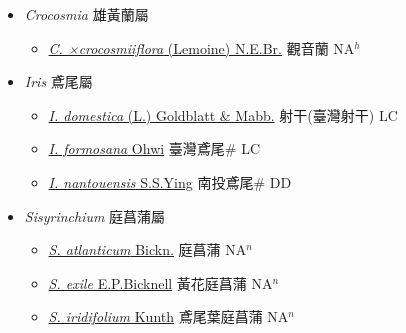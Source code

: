 
  \begin{itemize}
 \item[] \textit{Crocosmia} 雄黃蘭屬
                    
  \begin{itemize}
        \item[] \href{http://www.theplantlist.org/tpl1.1/search?q=Crocosmia+×crocosmiiflora}{\textit{C. ×crocosmiiflora} (Lemoine) N.E.Br.}   觀音蘭 NA$^h$
  \end{itemize}
 \item[] \textit{Iris} 鳶尾屬
                    
  \begin{itemize}
        \item[] \href{http://www.theplantlist.org/tpl1.1/search?q=Iris+domestica}{\textit{I. domestica} (L.) Goldblatt \& Mabb.}        射干(臺灣射干)   LC
        \item[] \href{http://www.theplantlist.org/tpl1.1/search?q=Iris+formosana}{\textit{I. formosana} Ohwi}   臺灣鳶尾\# LC
        \item[] \href{http://www.theplantlist.org/tpl1.1/search?q=Iris+nantouensis}{\textit{I. nantouensis} S.S.Ying}   南投鳶尾\# DD
  \end{itemize}
 \item[] \textit{Sisyrinchium} 庭菖蒲屬
                    
  \begin{itemize}
        \item[] \href{http://www.theplantlist.org/tpl1.1/search?q=Sisyrinchium+atlanticum}{\textit{S. atlanticum} Bickn.}   庭菖蒲 NA$^n$
        \item[] \href{http://www.theplantlist.org/tpl1.1/search?q=Sisyrinchium+exile}{\textit{S. exile} E.P.Bicknell}     黃花庭菖蒲 NA$^n$
        \item[] \href{http://www.theplantlist.org/tpl1.1/search?q=Sisyrinchium+iridifolium}{\textit{S. iridifolium} Kunth}   鳶尾葉庭菖蒲 NA$^n$
  \end{itemize}
  \end{itemize}
